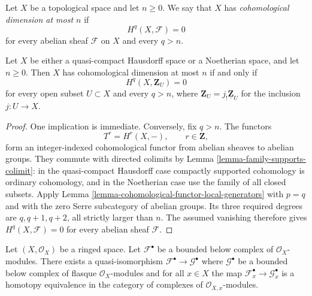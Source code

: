 \begin{definition}
\label{definition-cohomological-dimension}
\begin{reference}
\cite[Chapter III, \S 3.6, p. 170]{Tohoku}
\end{reference}
Let $X$ be a topological space and let $n \geq 0$. We say that $X$ has
{\it cohomological dimension at most $n$} if
$$
H^q(X, \mathcal{F})=0
$$
for every abelian sheaf $\mathcal{F}$ on $X$ and every $q>n$.
\end{definition}

\begin{lemma}
\label{lemma-cohomological-dimension-open-generators}
\begin{reference}
\cite[Chapter III, \S 3.6, Corollary to Proposition 3.6.3,
p. 170]{Tohoku}
\end{reference}
Let $X$ be either a quasi-compact Hausdorff space or a Noetherian space,
and let $n \geq 0$. Then $X$ has cohomological dimension at most $n$ if
and only if
$$
H^q(X, \mathbf{Z}_U)=0
$$
for every open subset $U \subset X$ and every $q>n$, where
$\mathbf{Z}_U=j_!\underline{\mathbf{Z}}_U$ for the inclusion
$j:U\to X$.
\end{lemma}

\begin{proof}
One implication is immediate. Conversely, fix $q>n$. The functors
$$
T^r=H^r(X,-),\qquad r\in\mathbf{Z},
$$
form an integer-indexed cohomological functor from abelian sheaves to
abelian groups. They commute with directed colimits by Lemma
\ref{lemma-family-supports-colimit}: in the quasi-compact Hausdorff case
compactly supported cohomology is ordinary cohomology, and in the
Noetherian case use the family of all closed subsets. Apply Lemma
\ref{lemma-cohomological-functor-local-generators} with $p=q$ and with the
zero Serre subcategory of abelian groups. Its three required degrees are
$q,q+1,q+2$, all strictly larger than $n$. The assumed vanishing therefore
gives $H^q(X,\mathcal{F})=0$ for every abelian sheaf $\mathcal{F}$.
\end{proof}


\begin{lemma}
\label{lemma-godement-resolution-bounded-below}
Let $(X, \mathcal{O}_X)$ be a ringed space. Let
$\mathcal{F}^\bullet$ be a bounded below complex of
$\mathcal{O}_X$-modules. There exists a quasi-isomorphism
$\mathcal{F}^\bullet \to \mathcal{G}^\bullet$
where $\mathcal{G}^\bullet$ be a bounded below complex of flasque
$\mathcal{O}_X$-modules and for all $x \in X$ the
map $\mathcal{F}^\bullet_x \to \mathcal{G}^\bullet_x$
is a homotopy equivalence in the category of complexes
of $\mathcal{O}_{X, x}$-modules.
\end{lemma}

